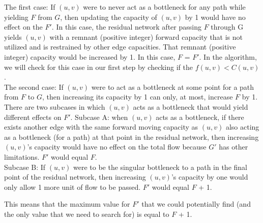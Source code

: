 \documentclass[11pt, solution, letterpaper]{format}
\begin{document}
The first case: If $(u, v)$ were to never act as a bottleneck for any path while yielding $F$ from $G$, then updating the capacity of $(u, v)$ by 1 would have no effect on the $F'$. In this case, the residual network after passing $F$ through G yields $(u, v)$ with a remnant (positive integer) forward capacity that is not utilized and is restrained by other edge capacities. That remnant (positive integer) capacity would be increased by 1. In this case, $F$ = $F'$. In the algorithm, we will check for this case in our first step by checking if the $f(u, v) < C(u, v)$.  \\

The second case: If $(u, v)$ were to act as a bottleneck at some point for a path from $F$ to $G$, then increasing its capacity by 1 can only, at most, increase $F$ by 1.  \\
There are two subcases in which $(u, v)$ acts as a bottleneck that would yield different effects on $F'$. 
Subcase A: when $(u, v)$ acts as a bottleneck, if there exists another edge with the same forward moving capacity as $(u, v)$ also acting as a bottleneck (for a path) at that point in the residual network, then increasing $(u, v)$'s capacity would have no effect on the total flow because $G'$ has other limitations. $F'$ would equal $F$.\\
Subcase B: If $(u, v)$ were to be the singular bottleneck to a path in the final point of the residual network, then increasing $(u, v)$'s capacity by one would only allow 1 more unit of flow to be passed. $F'$ would equal $F$ + 1.

This means that the maximum value for $F'$ that we could potentially find (and the only value that we need to search for) is equal to $F$ + 1. \\
\end{document}
